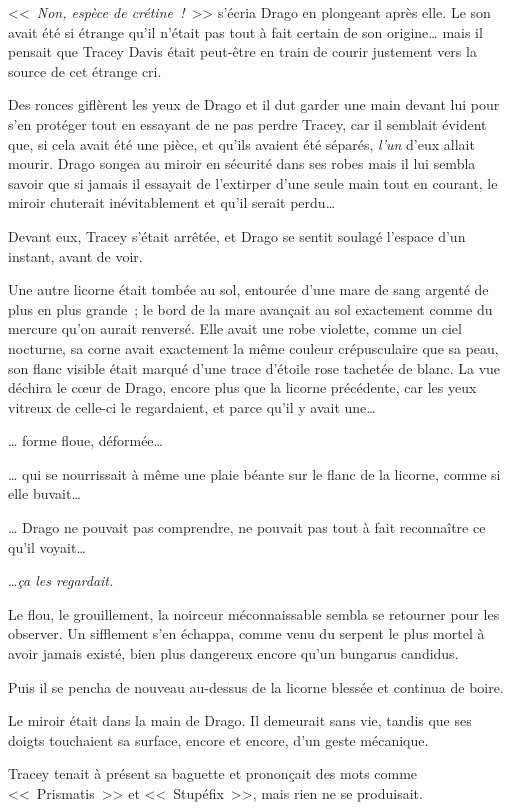 <<~\emph{Non, espèce de crétine~!}~>> s'écria Drago en plongeant après elle. Le son avait été si étrange qu'il n'était pas tout à fait certain de son origine… mais il pensait que Tracey Davis était peut-être en train de courir justement vers la source de cet étrange cri.

Des ronces giflèrent les yeux de Drago et il dut garder une main devant lui pour s'en protéger tout en essayant de ne pas perdre Tracey, car il semblait évident que, si cela avait été une pièce, et qu'ils avaient été séparés, \emph{l'un} d'eux allait mourir. Drago songea au miroir en sécurité dans ses robes mais il lui sembla savoir que si jamais il essayait de l'extirper d'une seule main tout en courant, le miroir chuterait inévitablement et qu'il serait perdu…

Devant eux, Tracey s'était arrêtée, et Drago se sentit soulagé l'espace d'un instant, avant de voir.

Une autre licorne était tombée au sol, entourée d'une mare de sang argenté de plus en plus grande~; le bord de la mare avançait au sol exactement comme du mercure qu'on aurait renversé. Elle avait une robe violette, comme un ciel nocturne, sa corne avait exactement la même couleur crépusculaire que sa peau, son flanc visible était marqué d'une trace d'étoile rose tachetée de blanc. La vue déchira le cœur de Drago, encore plus que la licorne précédente, car les yeux vitreux de celle-ci le regardaient, et parce qu'il y avait une…

… forme floue, déformée…

… qui se nourrissait à même une plaie béante sur le flanc de la licorne, comme si elle buvait…

… Drago ne pouvait pas comprendre, ne pouvait pas tout à fait reconnaître ce qu'il voyait…

…\emph{ça les regardait.}

Le flou, le grouillement, la noirceur méconnaissable sembla se retourner pour les observer. Un sifflement s'en échappa, comme venu du serpent le plus mortel à avoir jamais existé, bien plus dangereux encore qu'un bungarus candidus.

Puis il se pencha de nouveau au-dessus de la licorne blessée et continua de boire.

Le miroir était dans la main de Drago. Il demeurait sans vie, tandis que ses doigts touchaient sa surface, encore et encore, d'un geste mécanique.

Tracey tenait à présent sa baguette et prononçait des mots comme <<~Prismatis~>> et <<~Stupéfix~>>, mais rien ne se produisait.

